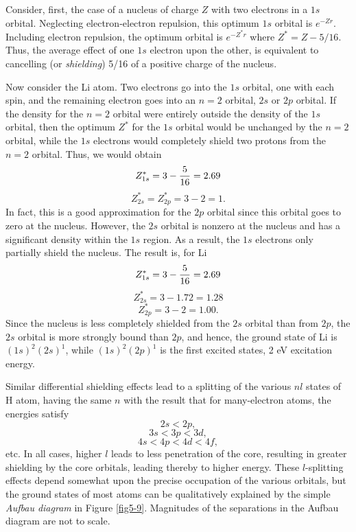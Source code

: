 Consider, first, the case of a nucleus of charge $Z$ with two
electrons in a $1s$ orbital.  Neglecting electron-electron repulsion,
this optimum $1s$ orbital is $e^{-Zr}$.  Including electron repulsion,
the optimum orbital is $e^{-Z^*r}$ where $Z^* = Z - 5/16$.  Thus, the
average effect of one $1s$ electron upon the other, is equivalent to
cancelling (or \emph{shielding}) 5/16 of a positive charge of the nucleus.

Now consider the Li atom. Two electrons go into the $1s$ orbital, one
with each spin, and the remaining electron goes into an $n = 2$
orbital, $2s$ or $2p$ orbital. If the density for the $n = 2$ orbital
were entirely outside the density of the $1s$ orbital, then the
optimum $Z^*$ for the $1s$ orbital would be unchanged by the $n = 2$
orbital, while the $1s$ electrons would completely shield two protons
from the $n = 2$ orbital.  Thus, we would obtain
\begin{equation}
Z^*_{1s} = 3 - {5 \over 16} = 2.69
\end{equation}
\begin{equation}
Z^*_{2s} = Z^*_{2p} = 3 - 2 = 1.
\end{equation}
In fact, this is a good approximation for the $2p$ orbital since this
orbital goes to zero at the nucleus. However, the $2s$ orbital is
nonzero at the nucleus and has a significant density within the $1s$
region.  As a result, the $1s$ electrons only partially shield the
nucleus.  The result is, for Li
\begin{equation}
Z^*_{1s} = 3 - {5 \over 16} = 2.69
\end{equation}
\begin{equation}
Z^*_{2s} = 3 - 1.72 = 1.28
\end{equation}
\begin{equation}
Z^*_{2p} = 3 - 2 = 1.00 .
\end{equation}
Since the nucleus is less completely shielded from the $2s$ orbital than 
from $2p$, the $2s$ orbital is more strongly bound than $2p$, and hence, the 
ground state of Li is $(1s)^2 (2s)^1$, while $(1s)^2 (2p)^1$ is the 
first excited states, 2 eV excitation energy.

Similar differential shielding effects lead to a splitting of the various 
$nl$ states of H atom, having the same $n$ with the result that for 
many-electron atoms, the energies satisfy
\begin{equation}
2s < 2p ,
\end{equation}
\begin{equation}
3s < 3p < 3d ,
\end{equation}
\begin{equation}
4s < 4p < 4d < 4f ,
\end{equation}
etc.  In all cases, higher $l$ leads to less penetration of the core,
resulting in greater shielding by the core orbitals, leading thereby
to higher energy.  These $l$-splitting effects depend somewhat upon
the precise occupation of the various orbitals, but the ground states
of most atoms can be qualitatively explained by the simple
\emph{Aufbau diagram} in Figure \ref{fig5-9}.  Magnitudes of the
separations in the Aufbau diagram are not to scale.

